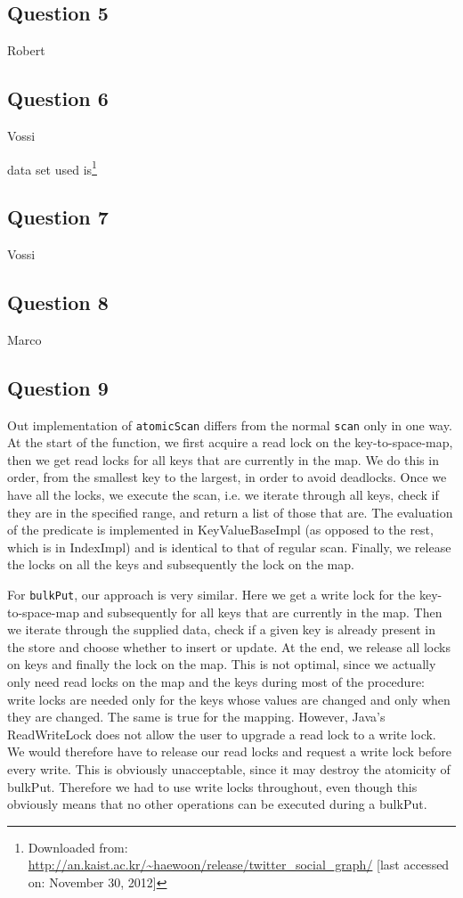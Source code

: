 \documentclass[12pt,a4paper]{article}
\begin{document}
\subsection*{Question 5}
\label{sec:pq5}
Robert

\subsection*{Question 6}
\label{sec:pq6}
Vossi

data set used is\footnote{Downloaded from: \url{http://an.kaist.ac.kr/~haewoon/release/twitter_social_graph/} [last accessed on: November 30, 2012]}

\subsection*{Question 7}
\label{sec:pq7} 
Vossi

\subsection*{Question 8}
\label{sec:pq8}
Marco

\subsection*{Question 9}
\label{sec:pq9}
Out implementation of \texttt{atomicScan} differs from the normal \texttt{scan} only in one way. At the start of the function, we first acquire a read lock on the key-to-space-map, then we get read locks for all keys that are currently in the map. We do this in order, from the smallest key to the largest, in order to avoid deadlocks. Once we have all the locks, we execute the scan, i.e. we iterate through all keys, check if they are in the specified range, and return a list of those that are. The evaluation of the predicate is implemented in KeyValueBaseImpl (as opposed to the rest, which is in IndexImpl) and is identical to that of regular scan. Finally, we release the locks on all the keys and subsequently the lock on the map.

For \texttt{bulkPut}, our approach is very similar. Here we get a write lock for the key-to-space-map and subsequently for all keys that are currently in the map. Then we iterate through the supplied data, check if a given key is already present in the store and choose whether to insert or update. At the end, we release all locks on keys and finally the lock on the map. This is not optimal, since we actually only need read locks on the map and the keys during most of the procedure: write locks are needed only for the keys whose values are changed and only when they are changed. The same is true for the mapping. However, Java's ReadWriteLock does not allow the user to upgrade a read lock to a write lock. We would therefore have to release our read locks and request a write lock before every write. This is obviously unacceptable, since it may destroy the atomicity of bulkPut. Therefore we had to use write locks throughout, even though this obviously means that no other operations can be executed during a bulkPut.
 
\end{document}

